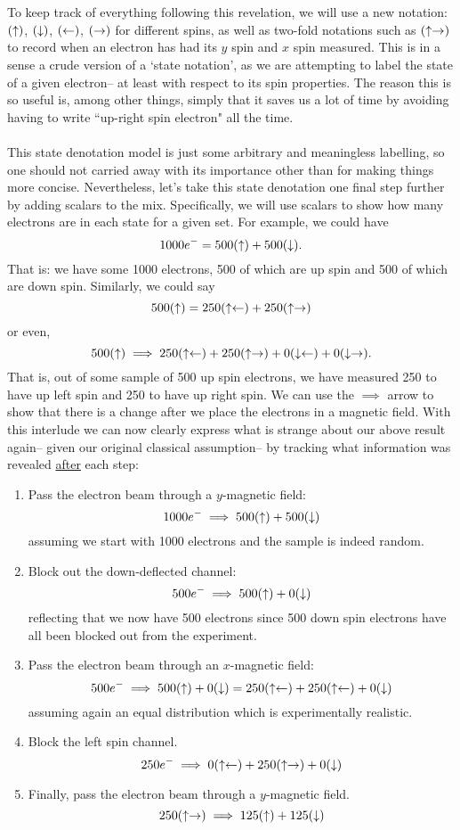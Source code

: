 \\\\
To keep track of everything following this revelation, we will use a new notation: $(\uparrow)$, $(\downarrow)$, $(\leftarrow)$, $(\rightarrow)$ for different spins, as well as two-fold notations such as $(\uparrow\rightarrow)$ to record when an electron has had its $y$ spin and $x$ spin measured. This is in a sense a crude version of a `state notation',
as we are attempting to label the state of a given electron-- at least with respect to its spin properties. The reason this is so useful is, among other things, simply that it saves us a lot of time by avoiding having to write ``up-right spin electron" all the time.
\\\\
This state denotation model is just some arbitrary and meaningless labelling, so one should not carried away with its importance other than for making things more concise. Nevertheless, let's take this state denotation one final step further by adding scalars to the mix. Specifically, we will use scalars to show how many electrons are in each state for a given set. For example, we could have 
$$
1000e^{-}=500(\uparrow) + 500(\downarrow).
$$
That is: we have some 1000 electrons, 500 of which are up spin and 500 of which are down spin. Similarly, we could say 
$$
500(\uparrow) = 250(\uparrow\leftarrow) + 250(\uparrow\rightarrow)
$$
or even, 
$$
500(\uparrow) \implies 250(\uparrow\leftarrow) + 250(\uparrow\rightarrow) + 0(\downarrow\leftarrow) + 0(\downarrow\rightarrow).
$$
That is, out of some sample of 500 up spin electrons, we have measured 250 to have up left spin and 250 to have up right spin. We can use the $\implies$ arrow to show that there is a change after we place the electrons in a magnetic field. With this interlude we can now clearly express what is strange about our above result again-- given our original classical assumption-- by tracking what information was revealed \underline{after} each step:
\begin{enumerate}
    \item Pass the electron beam through a $y$-magnetic field:
    $$
    1000e^{-} \implies 500(\uparrow)+500(\downarrow)
    $$
    assuming we start with 1000 electrons and the sample is indeed random.
    \item Block out the down-deflected channel:
    $$
    500e^{-} \implies 500(\uparrow)+0(\downarrow)
    $$
    reflecting that we now have 500 electrons since 500 down spin electrons have all been blocked out from the experiment.
    \item Pass the electron beam through an $x$-magnetic field:
    $$
    500e^{-} \implies500(\uparrow)+0(\downarrow)=250(\uparrow\leftarrow)+250(\uparrow\leftarrow)+0(\downarrow)
    $$
    assuming again an equal distribution which is experimentally realistic.
    \item Block the left spin channel.
    $$
    250e^{-}\implies0(\uparrow\leftarrow)+ 250(\uparrow\rightarrow) + 0(\downarrow)
    $$
    \item Finally, pass the electron beam through a $y$-magnetic field.
    $$
    250(\uparrow\rightarrow)\implies125(\uparrow)+125(\downarrow)
    $$
\end{enumerate}
